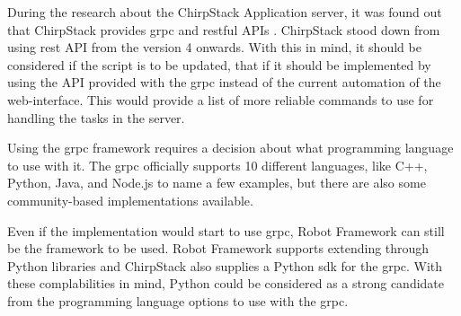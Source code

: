 During the research about the ChirpStack Application server, it was found out that ChirpStack provides \gls{grpc} and \gls{rest}ful APIs \cite{chirpstack:applicationServer}.
ChirpStack stood down from using \gls{rest} API from the version 4 onwards.
With this in mind, it should be considered if the script is to be updated, that if it should be implemented by using the API provided with the \gls{grpc} instead of the current automation of the web-interface.
This would provide a list of more reliable commands to use for handling the tasks in the server.

\clearpage

Using the \gls{grpc} framework requires a decision about what programming language to use with it.
The \gls{grpc} officially supports 10 different languages, like C++, Python, Java, and Node.js to name a few examples, but there are also some community-based implementations available.

Even if the implementation would start to use \gls{grpc}, Robot Framework can still be the framework to be used.
Robot Framework supports extending through Python libraries and ChirpStack also supplies a Python \gls{sdk} for the \gls{grpc}.
With these complabilities in mind, Python could be considered as a strong candidate from the programming language options to use with the \gls{grpc}.



\clearpage %